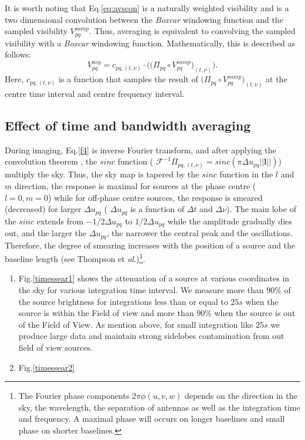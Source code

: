 \documentclass[useAMS,usenatbib]{mn2e}
\begin{document}
It is worth noting that Eq.\ref{eq:avscon} is a naturally weighted visibility and is a two dimensional convolution between the 
\textit{Boxcar} windowing function and the sampled visibility $V_{pq}^{samp}$. Thus, averaging is equivalent to convolving the 
sampled 
visibility with a \textit{Boxcar} windowing function. Mathematically, this is described as follows:
\begin{equation}
 V_{pq}^{avg}=c_{pq,(t,\nu)}\cdot\Bigg(\Big(\Pi_{pq}\circ V_{pq}^{samp}\Big)_{(t,\nu)}\Bigg). \label{f4}
\end{equation}
Here, $c_{pq,(t,\nu)}$ is a function that samples the result of $\Big(\Pi_{pq}\circ V_{pq}^{samp}\Big)_{(t,\nu)}$ at 
the centre time interval and centre frequency interval.
\subsection{Effect of time and bandwidth averaging}
During imaging, Eq.\ref{f4} is inverse Fourier transform, and after applying the convolution theorem , the $sinc$ function ( 
$\mathcal{F}^{-1}\Pi_{pq, (t,\nu)}=sinc(\pi\Delta u_{pq}||\textbf{l}||)$) multiply the sky. Thus, the 
sky map is tapered by the $sinc$ function in the $l$ and $m$ direction, the response is maximal for sources at the phase centre ( 
$l=0,m=0$) while for off-phase centre sources, the response is smeared (decreased) for larger $\Delta u_{pq}$ ( 
$\Delta u_{pq}$ is a function of $\Delta t$ and $\Delta \nu$). The main lobe of the $sinc$ extends from 
$-1/2\Delta u_{pq}$ to $1/2\Delta u_{pq}$ while the amplitude gradually dies out, and the larger the $\Delta 
u_{pq}$, the narrower the central peak and the oscillations. Therefore, the degree of smearing increases with the position of a 
source and the baseline length (see Thompson et \textit{al}.)\footnote{The Fourier phase components $2\pi \phi(u,v,w)$ depends on the 
direction in the sky, the wavelength, the separation of antennas as well as the integration time and frequency. A maximal phase will 
occurs on longer baselines and small phase on shorter baselines.}.
\begin{enumerate}
 \item Fig.\ref{timessear1} shows the attenuation of a source at various coordinates in the sky for various integration time interval. We 
measure  more than $90\%$ of the source brightness for integrations less than or equal to $25s$ when the source is within the 
       Field of view and more than $90\%$ when the source is out of the Field of View. As mention above, for small integration like $25s$ 
       we produce large data  and maintain strong sidelobes contamination from out field of view sources.
  \item Fig.\ref{timessear2} 
\end{enumerate}
\end{document}
